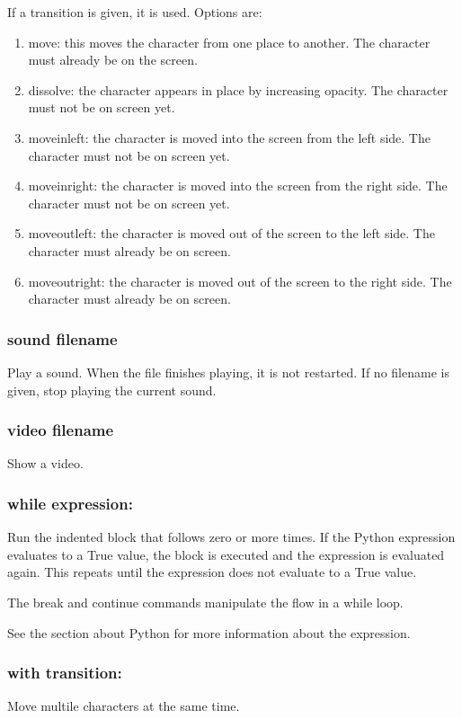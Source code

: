 \documentclass{article}
\begin{document}
If a transition is given, it is used. Options are:
\begin{enumerate}
	\item move: this moves the character from one place to another. The
		character must already be on the screen.
	\item dissolve: the character appears in place by increasing opacity.
		The character must not be on screen yet.
	\item moveinleft: the character is moved into the screen from the left
		side.  The character must not be on screen yet.
	\item moveinright: the character is moved into the screen from the
		right side.  The character must not be on screen yet.
	\item moveoutleft: the character is moved out of the screen to the left
		side.  The character must already be on screen.
	\item moveoutright: the character is moved out of the screen to the
		right side.  The character must already be on screen.
\end{enumerate}

\subsubsection{sound filename}
Play a sound. When the file finishes playing, it is not restarted. If no
filename is given, stop playing the current sound.

\subsubsection{video filename}
Show a video.

\subsubsection{while expression:}
Run the indented block that follows zero or more times. If the Python
expression evaluates to a True value, the block is executed and the expression
is evaluated again. This repeats until the expression does not evaluate to a
True value.

The break and continue commands manipulate the flow in a while loop.

See the section about Python for more information about the expression.

\subsubsection{with transition:}
Move multile characters at the same time.
\end{document}
